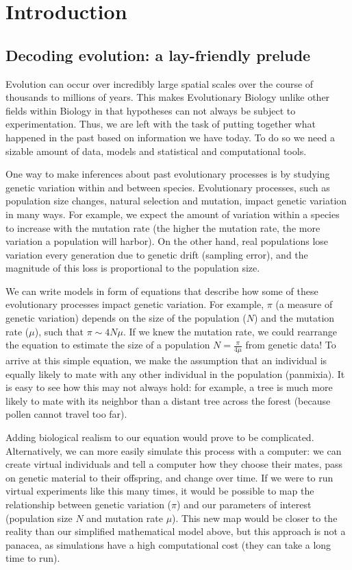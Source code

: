 \chapter{Introduction}

\section{Decoding evolution: a lay-friendly prelude}

Evolution can occur over incredibly large spatial scales over the course of thousands to millions of years.
This makes Evolutionary Biology unlike other fields within Biology in that hypotheses can not always be subject to experimentation.
Thus, we are left with the task of putting together what happened in the past based on information we have today.
To do so we need a sizable amount of data, models and statistical and computational tools.

One way to make inferences about past evolutionary processes is by studying genetic variation within and between species.
Evolutionary processes, such as population size changes, natural selection and mutation, impact genetic variation in many ways.
For example, we expect the amount of variation within a species to increase with the mutation rate (\ie the higher the mutation rate, the more variation a population will harbor).
On the other hand, real populations lose variation every generation due to genetic drift (\ie sampling error), 
and the magnitude of this loss is proportional to the population size.

We can write models in form of equations that describe how some of these evolutionary processes impact genetic variation.
For example, $\pi$ (a measure of genetic variation) depends on the size of the population ($N$) and the mutation rate ($\mu$), such that $\pi \sim 4N\mu$.
If we knew the mutation rate, we could rearrange the equation to estimate the size of a population $N = \frac{\pi}{4\mu}$ from genetic data!
To arrive at this simple equation, we make the assumption that an individual is equally likely to mate with any other individual in the population (\ie panmixia).
It is easy to see how this may not always hold:
for example, a tree is much more likely to mate with its neighbor than a distant tree across the forest (because pollen cannot travel too far).

Adding biological realism to our equation would prove to be complicated.
Alternatively, we can more easily simulate this process with a computer:
we can create virtual individuals and tell a computer how they choose their mates, pass on genetic material to their offspring, and change over time.
If we were to run virtual experiments like this many times,
it would be possible to map the relationship between genetic variation ($\pi$) and our parameters of interest (population size $N$ and mutation rate $\mu$).
This new map would be closer to the reality than our simplified mathematical model above,
but this approach is not a panacea, as simulations have a high computational cost (\ie they can take a long time to run).

